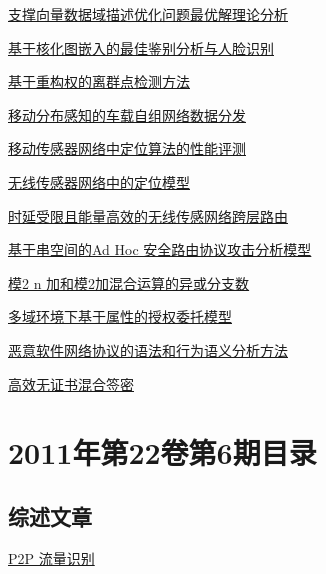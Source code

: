 \documentclass[a4paper]{article}
\begin{document}
\href{http://www.jos.org.cn/ch/reader/download_pdf.aspx?file_no=3856&year_id=2011&quarter_id=7&falg=1}{支撑向量数据域描述优化问题最优解理论分析}

\href{http://www.jos.org.cn/ch/reader/download_pdf.aspx?file_no=3843&year_id=2011&quarter_id=7&falg=1}{基于核化图嵌入的最佳鉴别分析与人脸识别}

\href{http://www.jos.org.cn/ch/reader/download_pdf.aspx?file_no=3839&year_id=2011&quarter_id=7&falg=1}{基于重构权的离群点检测方法}

\href{http://www.jos.org.cn/ch/reader/download_pdf.aspx?file_no=3871&year_id=2011&quarter_id=7&falg=1}{移动分布感知的车载自组网络数据分发}

\href{http://www.jos.org.cn/ch/reader/download_pdf.aspx?file_no=3864&year_id=2011&quarter_id=7&falg=1}{移动传感器网络中定位算法的性能评测}

\href{http://www.jos.org.cn/ch/reader/download_pdf.aspx?file_no=3836&year_id=2011&quarter_id=7&falg=1}{无线传感器网络中的定位模型}

\href{http://www.jos.org.cn/ch/reader/download_pdf.aspx?file_no=3838&year_id=2011&quarter_id=7&falg=1}{时延受限且能量高效的无线传感网络跨层路由}

\href{http://www.jos.org.cn/ch/reader/download_pdf.aspx?file_no=3866&year_id=2011&quarter_id=7&falg=1}{基于串空间的Ad Hoc 安全路由协议攻击分析模型}

\href{http://www.jos.org.cn/ch/reader/download_pdf.aspx?file_no=3837&year_id=2011&quarter_id=7&falg=1}{模2 n 加和模2加混合运算的异或分支数}

\href{http://www.jos.org.cn/ch/reader/download_pdf.aspx?file_no=3870&year_id=2011&quarter_id=7&falg=1}{多域环境下基于属性的授权委托模型}

\href{http://www.jos.org.cn/ch/reader/download_pdf.aspx?file_no=3858&year_id=2011&quarter_id=7&falg=1}{恶意软件网络协议的语法和行为语义分析方法}

\href{http://www.jos.org.cn/ch/reader/download_pdf.aspx?file_no=3825&year_id=2011&quarter_id=7&falg=1}{高效无证书混合签密}


\section{\textbf{2011年第22卷第6期目录}}
\subsection{综述文章}
\href{http://www.jos.org.cn/ch/reader/download_pdf.aspx?file_no=3995&year_id=2011&quarter_id=6&falg=1}{P2P 流量识别}
\end{document}
